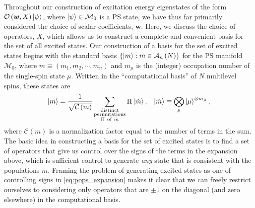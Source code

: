 \documentclass[nofootinbib,notitlepage,11pt]{revtex4-2}
\renewcommand{\t}{\text} %
\newcommand{\f}[2]{\dfrac{#1}{#2}} %
\newcommand{\p}[1]{\left(#1\right)} %
\renewcommand{\set}[1]{\left\{#1\right\}} %
\newcommand{\m}{\bm} %
\newcommand{\1}{\mathds{1}}
\newcommand{\A}{\mathcal{A}}
\newcommand{\C}{\mathcal{C}}
\newcommand{\M}{\mathcal{M}}
\renewcommand{\O}{\mathcal{O}}
\begin{document}
Throughout our construction of excitation energy eigenstates of the
form $\O\p{\m w,X}\ket\psi$, where $\ket\psi\in\M_0$ is a PS state, we
have thus far primarily considered the choice of scalar coefficients,
$\m w$.  Here, we discuss the choice of operators, $X$, which allows
us to construct a complete and convenient basis for the set of all
excited states.  Our construction of a basis for the set of excited
states begins with the standard basis $\set{\ket{m}:m\in\A_n\p{N}}$
for the PS manifold $\M_0$, where $m\equiv\p{m_1,m_2,\cdots,m_n}$ and
$m_\mu$ is the (integer) occupation number of the single-spin state
$\mu$.  Written in the ``computational basis'' of $N$ multilevel
spins, these states are
\begin{align}
  \ket{m} =
  \f1{\sqrt{\C\p{m}}}
  \sum_{\substack{\t{distinct}\\\t{permutations}\\\Pi~\t{of}~\tilde m}}
  \Pi \ket{\tilde m},
  &&
  \ket{\tilde m} \equiv \bigotimes_\mu \ket{\mu}^{\otimes m_\mu},
  \label{eq:pops_expansion}
\end{align}
where $\C\p{m}$ is a normalization factor equal to the number of terms
in the sum.  The basic idea in constructing a basis for the set of
excited states is to find a set of operators that give us control over
the signs of the terms in the expansion above, which is sufficient
control to generate {\it any} state that is consistent with the
populations $m$.  Framing the problem of generating excited states as
one of controlling signs in \eqref{eq:pops_expansion} makes it clear
that we can freely restrict ourselves to considering only operators
that are $\pm1$ on the diagonal (and zero elsewhere) in the
computational basis.
\end{document}
